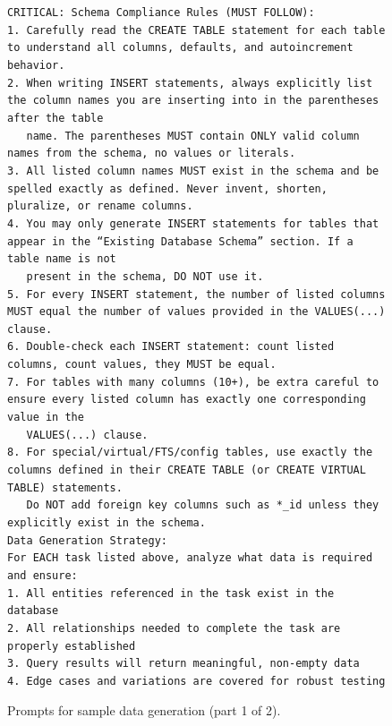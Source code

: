 \begin{figure}[p]
{\begin{minipage}{0.97\textwidth}
        \texttt{CRITICAL: Schema Compliance Rules (MUST FOLLOW):}\\
        \texttt{1. Carefully read the CREATE TABLE statement for each table to understand all columns, defaults, and autoincrement behavior.}\\
        \texttt{2. When writing INSERT statements, always explicitly list the column names you are inserting into in the parentheses after the table}\\
        \texttt{~~~name. The parentheses MUST contain ONLY valid column names from the schema, no values or literals.}\\
        \texttt{3. All listed column names MUST exist in the schema and be spelled exactly as defined. Never invent, shorten, pluralize, or rename columns.}\\
        \texttt{4. You may only generate INSERT statements for tables that appear in the ``Existing Database Schema'' section. If a table name is not}\\
        \texttt{~~~present in the schema, DO NOT use it.}\\
        \texttt{5. For every INSERT statement, the number of listed columns MUST equal the number of values provided in the VALUES(...) clause.}\\
        \texttt{6. Double-check each INSERT statement: count listed columns, count values, they MUST be equal.}\\
        \texttt{7. For tables with many columns (10+), be extra careful to ensure every listed column has exactly one corresponding value in the}\\
        \texttt{~~~VALUES(...) clause.}\\
        \texttt{8. For special/virtual/FTS/config tables, use exactly the columns defined in their CREATE TABLE (or CREATE VIRTUAL TABLE) statements.}\\
        \texttt{~~~Do NOT add foreign key columns such as *\_id unless they explicitly exist in the schema.}\\[4pt]

        \texttt{Data Generation Strategy:}\\
        \texttt{For EACH task listed above, analyze what data is required and ensure:}\\
        \texttt{1. All entities referenced in the task exist in the database}\\
        \texttt{2. All relationships needed to complete the task are properly established}\\
        \texttt{3. Query results will return meaningful, non-empty data}\\
        \texttt{4. Edge cases and variations are covered for robust testing}

        \vspace{1pt}
        \end{minipage}
    }
    \captionsetup{labelformat=default, name=Figure}
    \caption{Prompts for sample data generation (part 1 of 2).}
    \label{fig:gen-data-1}
\end{figure}
